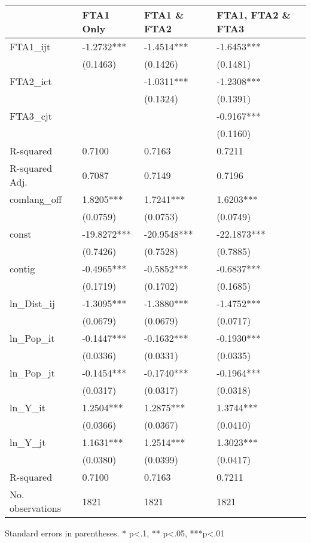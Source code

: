 \begin{table}
\caption{}
\label{}
\begin{center}
\begin{tabular}{llll}
\hline
                 & FTA1 Only   & FTA1 \& FTA2 & FTA1, FTA2 \& FTA3  \\
\hline
FTA1\_ijt        & -1.2732***  & -1.4514***   & -1.6453***          \\
                 & (0.1463)    & (0.1426)     & (0.1481)            \\
FTA2\_ict        &             & -1.0311***   & -1.2308***          \\
                 &             & (0.1324)     & (0.1391)            \\
FTA3\_cjt        &             &              & -0.9167***          \\
                 &             &              & (0.1160)            \\
R-squared        & 0.7100      & 0.7163       & 0.7211              \\
R-squared Adj.   & 0.7087      & 0.7149       & 0.7196              \\
comlang\_off     & 1.8205***   & 1.7241***    & 1.6203***           \\
                 & (0.0759)    & (0.0753)     & (0.0749)            \\
const            & -19.8272*** & -20.9548***  & -22.1873***         \\
                 & (0.7426)    & (0.7528)     & (0.7885)            \\
contig           & -0.4965***  & -0.5852***   & -0.6837***          \\
                 & (0.1719)    & (0.1702)     & (0.1685)            \\
ln\_Dist\_ij     & -1.3095***  & -1.3880***   & -1.4752***          \\
                 & (0.0679)    & (0.0679)     & (0.0717)            \\
ln\_Pop\_it      & -0.1447***  & -0.1632***   & -0.1930***          \\
                 & (0.0336)    & (0.0331)     & (0.0335)            \\
ln\_Pop\_jt      & -0.1454***  & -0.1740***   & -0.1964***          \\
                 & (0.0317)    & (0.0317)     & (0.0318)            \\
ln\_Y\_it        & 1.2504***   & 1.2875***    & 1.3744***           \\
                 & (0.0366)    & (0.0367)     & (0.0410)            \\
ln\_Y\_jt        & 1.1631***   & 1.2514***    & 1.3023***           \\
                 & (0.0380)    & (0.0399)     & (0.0417)            \\
R-squared        & 0.7100      & 0.7163       & 0.7211              \\
No. observations & 1821        & 1821         & 1821                \\
\hline
\end{tabular}
\end{center}
\end{table}
\bigskip
Standard errors in parentheses. \newline 
* p<.1, ** p<.05, ***p<.01